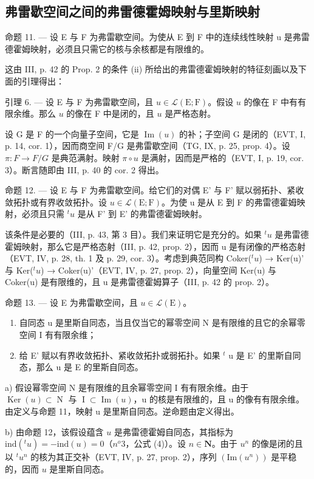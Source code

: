 \subsection{弗雷歇空间之间的弗雷德霍姆映射与里斯映射}

命题 11. --- 设 E 与 F 为弗雷歇空间。为使从 E 到 F 中的连续线性映射 u 是弗雷德霍姆映射，必须且只需它的核与余核都是有限维的。

这由 III, p. 42 的 Prop. 2 的条件 (ii) 所给出的弗雷德霍姆映射的特征刻画以及下面的引理得出：

引理 6. --- 设 E 与 F 为弗雷歇空间，且 \(u \in \mathcal{L}(\mathrm{E};\mathrm{F})\)。假设 \(u\) 的像在 F 中有有限余维。那么 \(u\) 的像在 F 中是闭的，且 \(u\) 是严格态射。

设 G 是 F 的一个向量子空间，它是 \(\operatorname{Im}(u)\) 的补；子空间 G 是闭的（EVT, I, p. 14, cor. 1），因而商空间 F/G 是弗雷歇空间（TG, IX, p. 25, prop. 4）。设 \(\pi: F \to F/G\) 是典范满射。映射 \(\pi \circ u\) 是满射，因而是严格的（EVT, I, p. 19, cor. 3）。断言随即由 III, p. 40 的 cor. 2 得出。

命题 12. --- 设 E 与 F 为弗雷歇空间。给它们的对偶 E' 与 F' 赋以弱拓扑、紧收敛拓扑或有界收敛拓扑。设 \(u \in \mathcal{L}(\mathrm{E};\mathrm{F})\)。为使 u 是从 E 到 F 的弗雷德霍姆映射，必须且只需 \({}^{t}u\) 是从 F' 到 E' 的弗雷德霍姆映射。

该条件是必要的（III, p. 43, 第 3 目）。我们来证明它是充分的。如果 \(^{t}u\) 是弗雷德霍姆映射，那么它是严格态射（III, p. 42, prop. 2），因而 u 是有闭像的严格态射（EVT, IV, p. 28, th. 1 及 p. 29, cor. 3）。考虑到典范同构 Coker(\(^{t}u\)) → Ker(u)' 与 Ker(\(^{t}u\)) → Coker(u)'（EVT, IV, p. 27, prop. 2），向量空间 Ker(u) 与 Coker(u) 是有限维的，且 u 是弗雷德霍姆算子（III, p. 42 的 prop. 2）。

命题 13. --- 设 E 为弗雷歇空间，且 \(u \in \mathcal{L}(\mathrm{E})\)。

\begin{enumerate}
\def\labelenumi{\alph{enumi})}
\item
  自同态 u 是里斯自同态，当且仅当它的幂零空间 N 是有限维的且它的余幂零空间 I 有有限余维；
\item
 给 E' 赋以有界收敛拓扑、紧收敛拓扑或弱拓扑。如果 \(^{t}\) u 是 E' 的里斯自同态，那么 u 是 E 的里斯自同态。
\end{enumerate}
a) 假设幂零空间 N 是有限维的且余幂零空间 I 有有限余维。由于 \(\operatorname{Ker}(u) \subset \operatorname{N}\) 与 \(\operatorname{I} \subset \operatorname{Im}(u)\)，u 的核是有限维的，且 u 的像有有限余维。由定义与命题 11，映射 u 是里斯自同态。逆命题由定义得出。

b) 由命题 12，该假设蕴含 \(u\) 是弗雷德霍姆自同态，其指标为 \(\text{ind}(^t u) = -\text{ind}(u) = 0\)（\(n^o 3\)，公式 (4)）。设 \(n \in \mathbf{N}\)。由于 \(u^n\) 的像是闭的且以 \(^t u^n\) 的核为其正交补（EVT, IV, p. 27, prop. 2），序列 \((\text{Im}(u^n))\) 是平稳的，因而 \(u\) 是里斯自同态。


